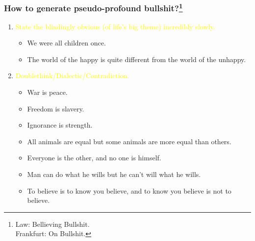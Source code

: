 \documentclass[UTF8,11pt,colorlinks,compress,openany]{beamer}%
\begin{document}
\begin{frame}\frametitle{How to generate pseudo-profound bullshit?\footnote{Law: Bellieving Bullshit.\\
Frankfurt: On Bullshit.}}
	\begin{enumerate}
		\item \textcolor{yellow}{State the blindingly obvious (of life's big theme) incredibly slowly.}
		\begin{itemize}
			\item We were all children once.
			\item The world of the happy is quite different from the world of the unhappy.
		\end{itemize}
		\item \textcolor{yellow}{Doublethink/Dialectic/Contradiction.}
		\begin{itemize}
			\item War is peace.
			\item Freedom is slavery.
			\item Ignorance is strength.
			\item All animals are equal but some animals are more equal than others.
			\item Everyone is the other, and no one is himself.
			\item Man can do what he wills but he can't will what he wills.
			\item To believe is to know you believe, and to know you believe is not to believe.
		\end{itemize}
	\end{enumerate}
\end{frame}
\end{document}

